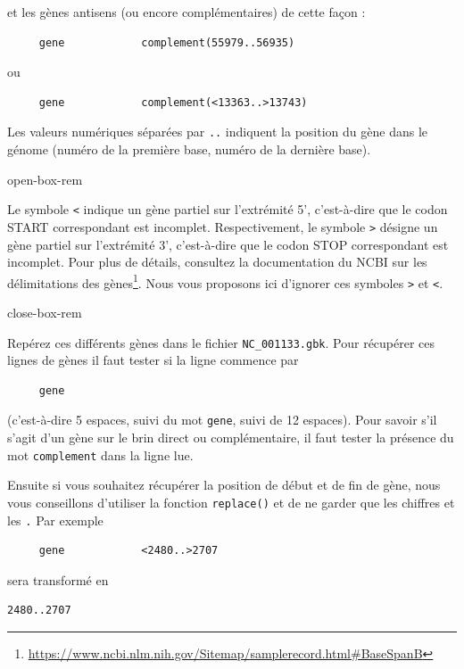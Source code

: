 \documentclass[a4paper,11pt,twoside]{book}
\renewcommand{\href}[2]{#2\footnote{\url{#1}}}
\begin{document}
et les gènes antisens (ou encore complémentaires) de cette façon :

\begin{verbatim}
     gene            complement(55979..56935)
\end{verbatim}

ou

\begin{verbatim}
     gene            complement(<13363..>13743)
\end{verbatim}

Les valeurs numériques séparées par \texttt{..} indiquent la position du
gène dans le génome (numéro de la première base, numéro de la dernière
base).

open-box-rem

Le symbole \texttt{\textless{}} indique un gène partiel sur l'extrémité
5', c'est-à-dire que le codon START correspondant est incomplet.
Respectivement, le symbole \texttt{\textgreater{}} désigne un gène
partiel sur l'extrémité 3', c'est-à-dire que le codon STOP correspondant
est incomplet. Pour plus de détails, consultez la documentation du NCBI
sur les
\href{https://www.ncbi.nlm.nih.gov/Sitemap/samplerecord.html\#BaseSpanB}{délimitations
des gènes}. Nous vous proposons ici d'ignorer ces symboles
\texttt{\textgreater{}} et \texttt{\textless{}}.

close-box-rem

Repérez ces différents gènes dans le fichier \texttt{NC\_001133.gbk}.
Pour récupérer ces lignes de gènes il faut tester si la ligne commence
par

\begin{verbatim}
     gene            
\end{verbatim}

(c'est-à-dire 5 espaces, suivi du mot \texttt{gene}, suivi de 12
espaces). Pour savoir s'il s'agit d'un gène sur le brin direct ou
complémentaire, il faut tester la présence du mot \texttt{complement}
dans la ligne lue.

Ensuite si vous souhaitez récupérer la position de début et de fin de
gène, nous vous conseillons d'utiliser la fonction \texttt{replace()} et
de ne garder que les chiffres et les \texttt{.} Par exemple

\begin{verbatim}
     gene            <2480..>2707
\end{verbatim}

sera transformé en

\begin{verbatim}
2480..2707
\end{verbatim}
\end{document}
